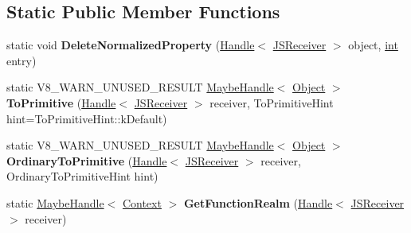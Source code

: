 \subsection*{Static Public Member Functions}
\begin{DoxyCompactItemize}
\item 
\mbox{\label{classv8_1_1internal_1_1JSReceiver_ae442e45691e0ca2b3be155c56ff554e9}} 
static void {\bfseries Delete\+Normalized\+Property} (\mbox{\hyperlink{classv8_1_1internal_1_1Handle}{Handle}}$<$ \mbox{\hyperlink{classv8_1_1internal_1_1JSReceiver}{J\+S\+Receiver}} $>$ object, \mbox{\hyperlink{classint}{int}} entry)
\item 
\mbox{\label{classv8_1_1internal_1_1JSReceiver_aae189c63893e7f2349bcb64464dd14be}} 
static V8\+\_\+\+W\+A\+R\+N\+\_\+\+U\+N\+U\+S\+E\+D\+\_\+\+R\+E\+S\+U\+LT \mbox{\hyperlink{classv8_1_1internal_1_1MaybeHandle}{Maybe\+Handle}}$<$ \mbox{\hyperlink{classv8_1_1internal_1_1Object}{Object}} $>$ {\bfseries To\+Primitive} (\mbox{\hyperlink{classv8_1_1internal_1_1Handle}{Handle}}$<$ \mbox{\hyperlink{classv8_1_1internal_1_1JSReceiver}{J\+S\+Receiver}} $>$ receiver, To\+Primitive\+Hint hint=To\+Primitive\+Hint\+::k\+Default)
\item 
\mbox{\label{classv8_1_1internal_1_1JSReceiver_aa4f9628aa2f37738678d0c8aec0f2d85}} 
static V8\+\_\+\+W\+A\+R\+N\+\_\+\+U\+N\+U\+S\+E\+D\+\_\+\+R\+E\+S\+U\+LT \mbox{\hyperlink{classv8_1_1internal_1_1MaybeHandle}{Maybe\+Handle}}$<$ \mbox{\hyperlink{classv8_1_1internal_1_1Object}{Object}} $>$ {\bfseries Ordinary\+To\+Primitive} (\mbox{\hyperlink{classv8_1_1internal_1_1Handle}{Handle}}$<$ \mbox{\hyperlink{classv8_1_1internal_1_1JSReceiver}{J\+S\+Receiver}} $>$ receiver, Ordinary\+To\+Primitive\+Hint hint)
\item 
\mbox{\label{classv8_1_1internal_1_1JSReceiver_a0a77f95a817b226a08074b6ab5a31f96}} 
static \mbox{\hyperlink{classv8_1_1internal_1_1MaybeHandle}{Maybe\+Handle}}$<$ \mbox{\hyperlink{classv8_1_1internal_1_1Context}{Context}} $>$ {\bfseries Get\+Function\+Realm} (\mbox{\hyperlink{classv8_1_1internal_1_1Handle}{Handle}}$<$ \mbox{\hyperlink{classv8_1_1internal_1_1JSReceiver}{J\+S\+Receiver}} $>$ receiver)
\item 
\mbox{\label{classv8_1_1internal_1_1JSReceiver_a57cf7cac1c2e36676422ce43487df0ae}} 

\end{DoxyCompactItemize}
